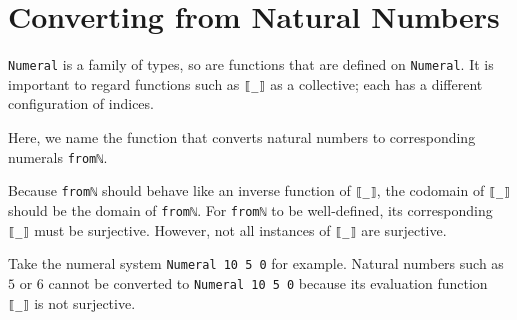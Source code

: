 \documentclass[\main/thesis.tex]{subfiles}
\begin{document}
\section{Converting from Natural Numbers}\label{fromnat}

\lstinline|Numeral| is a family of types, so are functions that are defined on
\lstinline|Numeral|.
It is important to regard functions such as \lstinline|⟦_⟧| as a collective;
each has a different configuration of indices.

Here, we name the function that converts natural numbers to corresponding
numerals \lstinline|fromℕ|.

\begin{center}
\end{center}

Because \lstinline|fromℕ| should behave like an inverse function of \lstinline|⟦_⟧|,
the codomain of \lstinline|⟦_⟧| should be the domain of \lstinline|fromℕ|.
For \lstinline|fromℕ| to be well-defined, its corresponding \lstinline|⟦_⟧|
must be surjective.
However, not all instances of \lstinline|⟦_⟧| are surjective.

Take the numeral system \lstinline|Numeral 10 5 0| for example.
Natural numbers such as $ 5 $ or $ 6 $ cannot be converted to
\lstinline|Numeral 10 5 0| because its evaluation function \lstinline|⟦_⟧|
is not surjective.
\end{document}
